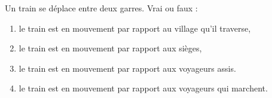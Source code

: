

\begin{exercice} \label{exo:mouv}\label{exo001}
Un train se déplace entre deux garres. Vrai ou faux :
\begin{enumerate}
\item le train est en mouvement par rapport au village qu'il traverse,
\item le train est en mouvement par rapport aux sièges,
\item le train est en mouvement par rapport aux voyageurs assis.
\item le train est en mouvement par rapport aux voyageurs qui marchent.
\end{enumerate}
\end{exercice}
